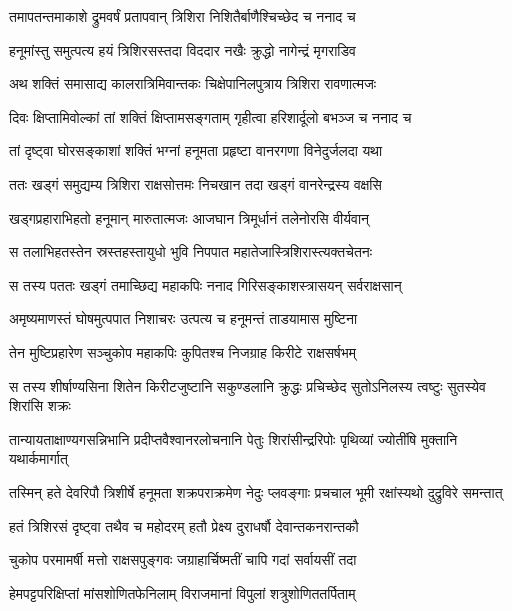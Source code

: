 \twolineshloka
{तमापतन्तमाकाशे द्रुमवर्षं प्रतापवान्}
{त्रिशिरा निशितैर्बाणैश्चिच्छेद च ननाद च} %

\twolineshloka
{हनूमांस्तु समुत्पत्य हयं त्रिशिरसस्तदा}
{विददार नखैः क्रुद्धो नागेन्द्रं मृगराडिव} %

\twolineshloka
{अथ शक्तिं समासाद्य कालरात्रिमिवान्तकः}
{चिक्षेपानिलपुत्राय त्रिशिरा रावणात्मजः} %

\twolineshloka
{दिवः क्षिप्तामिवोल्कां तां शक्तिं क्षिप्तामसङ्गताम्}
{गृहीत्वा हरिशार्दूलो बभञ्ज च ननाद च} %

\twolineshloka
{तां दृष्ट्वा घोरसङ्काशां शक्तिं भग्नां हनूमता}
{प्रहृष्टा वानरगणा विनेदुर्जलदा यथा} %

\twolineshloka
{ततः खड्गं समुद्यम्य त्रिशिरा राक्षसोत्तमः}
{निचखान तदा खड्गं वानरेन्द्रस्य वक्षसि} %

\twolineshloka
{खड्गप्रहाराभिहतो हनूमान् मारुतात्मजः}
{आजघान त्रिमूर्धानं तलेनोरसि वीर्यवान्} %

\twolineshloka
{स तलाभिहतस्तेन स्रस्तहस्तायुधो भुवि}
{निपपात महातेजास्त्रिशिरास्त्यक्तचेतनः} %

\twolineshloka
{स तस्य पततः खड्गं तमाच्छिद्य महाकपिः}
{ननाद गिरिसङ्काशस्त्रासयन् सर्वराक्षसान्} %

\twolineshloka
{अमृष्यमाणस्तं घोषमुत्पपात निशाचरः}
{उत्पत्य च हनूमन्तं ताडयामास मुष्टिना} %

\twolineshloka
{तेन मुष्टिप्रहारेण सञ्चुकोप महाकपिः}
{कुपितश्च निजग्राह किरीटे राक्षसर्षभम्} %

\twolineshloka
{स तस्य शीर्षाण्यसिना शितेन किरीटजुष्टानि सकुण्डलानि}
{क्रुद्धः प्रचिच्छेद सुतोऽनिलस्य त्वष्टुः सुतस्येव शिरांसि शक्रः} %

\twolineshloka
{तान्यायताक्षाण्यगसन्निभानि प्रदीप्तवैश्वानरलोचनानि}
{पेतुः शिरांसीन्द्ररिपोः पृथिव्यां ज्योतींषि मुक्तानि यथार्कमार्गात्} %

\twolineshloka
{तस्मिन् हते देवरिपौ त्रिशीर्षे हनूमता शक्रपराक्रमेण}
{नेदुः प्लवङ्गाः प्रचचाल भूमी रक्षांस्यथो दुद्रुविरे समन्तात्} %

\twolineshloka
{हतं त्रिशिरसं दृष्ट्वा तथैव च महोदरम्}
{हतौ प्रेक्ष्य दुराधर्षौ देवान्तकनरान्तकौ} %

\twolineshloka
{चुकोप परमामर्षी मत्तो राक्षसपुङ्गवः}
{जग्राहार्चिष्मतीं चापि गदां सर्वायसीं तदा} %

\twolineshloka
{हेमपट्टपरिक्षिप्तां मांसशोणितफेनिलाम्}
{विराजमानां विपुलां शत्रुशोणिततर्पिताम्} %

